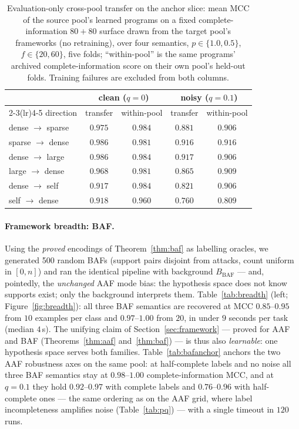 \documentclass[review,12pt]{elsarticle}
\theoremstyle{definition}
\theoremstyle{remark}
\begin{document}
\begin{table}[t]
\centering
\small
\caption{Evaluation-only cross-pool transfer on the anchor slice: mean MCC of
the source pool's learned programs on a fixed complete-information $80{+}80$
surface drawn from the target pool's frameworks (no retraining), over four
semantics, $p\in\{1.0,0.5\}$, $f\in\{20,60\}$, five folds; ``within-pool'' is
the same programs' archived complete-information score on their own pool's
held-out folds. Training failures are excluded from both columns.}
\label{tab:transfer}
\begin{tabular}{lcccc}
\toprule
& \multicolumn{2}{c}{clean ($q{=}0$)} & \multicolumn{2}{c}{noisy ($q{=}0.1$)}\\
\cmidrule(lr){2-3}\cmidrule(lr){4-5}
direction & transfer & within-pool & transfer & within-pool\\
\midrule
dense $\to$ sparse & $0.975$ & $0.984$ & $0.881$ & $0.906$\\
sparse $\to$ dense & $0.986$ & $0.981$ & $0.916$ & $0.916$\\
dense $\to$ large  & $0.986$ & $0.984$ & $0.917$ & $0.906$\\
large $\to$ dense  & $0.968$ & $0.981$ & $0.865$ & $0.909$\\
dense $\to$ self   & $0.917$ & $0.984$ & $0.821$ & $0.906$\\
self $\to$ dense   & $0.918$ & $0.960$ & $0.760$ & $0.809$\\
\bottomrule
\end{tabular}
\end{table}

\paragraph{Framework breadth: BAF.} Using the \emph{proved} encodings of
Theorem~\ref{thm:baf} as labelling oracles, we generated 500 random BAFs
(support pairs disjoint from attacks, count uniform in $[0,n]$) and ran the
identical pipeline with background $B_{\mathrm{BAF}}$ --- and, pointedly, the
\emph{unchanged} AAF mode bias: the hypothesis space does not know supports
exist; only the background interprets them. Table~\ref{tab:breadth} (left;
Figure~\ref{fig:breadth}):
all three BAF semantics are recovered at MCC $0.85$--$0.95$ from $10$ examples
per class and $0.97$--$1.00$ from $20$, in under $9$ seconds per task (median
$4$\,s). The unifying claim of Section~\ref{sec:framework} --- proved for AAF and
BAF (Theorems~\ref{thm:aaf} and~\ref{thm:baf}) --- is thus also
\emph{learnable}: one hypothesis space serves both families.
Table~\ref{tab:bafanchor} anchors the two AAF robustness axes on the same
pool: at half-complete labels and no noise all three BAF semantics stay at
$0.98$--$1.00$ complete-information MCC, and at $q{=}0.1$ they hold
$0.92$--$0.97$ with complete labels and $0.76$--$0.96$ with half-complete
ones --- the same ordering as on the AAF grid, where label incompleteness
amplifies noise (Table~\ref{tab:pq}) --- with a single timeout in $120$ runs.
\end{document}
